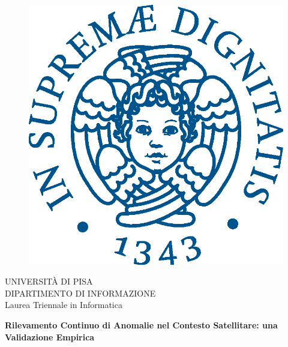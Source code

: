 \begin{titlepage}
\begin{figure}[!htb]
    \centering
    \includegraphics[keepaspectratio=true,scale=0.5]{images/Frontespizio/cherubinFrontespizio.eps}
\end{figure}

\begin{center}
    \LARGE{UNIVERSITÀ DI PISA}
    \vspace{5mm}
    \\ \large{DIPARTIMENTO DI INFORMAZIONE}
    \vspace{5mm}
    \\ \LARGE{Laurea Triennale in Informatica}
\end{center}

\vspace{12mm}
\begin{center}
    {\LARGE{\bf  Rilevamento Continuo di Anomalie nel Contesto Satellitare: una Validazione Empirica\\ \vspace{5mm}}}
    
    
\end{center}
\vspace{30mm}


\end{titlepage}
